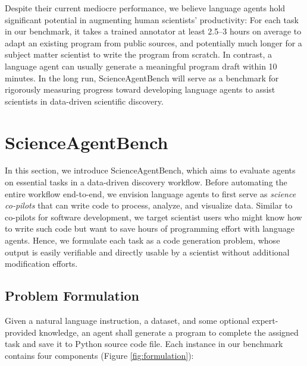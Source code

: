 \documentclass{article} %
\newcommand{\bench}{ScienceAgentBench\xspace}
\begin{document}
%
Despite their current mediocre performance, we believe language agents hold significant potential in augmenting human scientists' productivity:
For each task in our benchmark, it takes a trained annotator at least 2.5--3 hours on average to adapt an existing program from public sources, and potentially much longer for a subject matter scientist to write the program from scratch.
In contrast, a language agent can usually generate a meaningful program draft within 10 minutes. 
In the long run, \bench will serve as a benchmark for rigorously measuring progress toward developing language agents to assist scientists in data-driven scientific discovery.
%

\section{ScienceAgentBench}
\label{sec:benchmark}

%
In this section, we introduce \bench, which aims to evaluate agents on essential tasks in a data-driven discovery workflow. 
Before automating the entire workflow end-to-end, we envision language agents to first serve as \textit{science co-pilots} that can write code to process, analyze, and visualize data. 
Similar to co-pilots for software development, we target scientist users who might know how to write such code but want to save hours of programming effort with language agents.
Hence, we formulate each task as a code generation problem, whose output is easily verifiable and directly usable by a scientist without additional modification efforts.
%

\subsection{Problem Formulation}



%
Given a natural language instruction, a dataset, and some optional expert-provided knowledge, an agent shall generate a program to complete the assigned task and save it to Python source code file. 
Each instance in our benchmark contains four components (Figure \ref{fig:formulation}):
%
\end{document}
